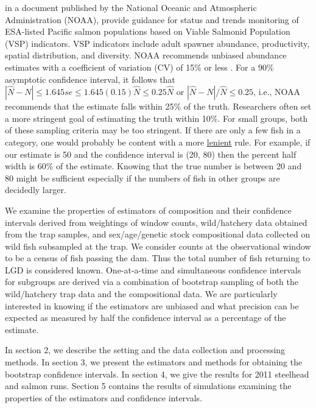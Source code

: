 \documentclass[12pt]{article}
\begin{document}
 in a document published by the National Oceanic and Atmospheric Administration (NOAA), provide guidance for status and trends monitoring of ESA-listed Pacific salmon populations based on Viable Salmonid Population (VSP) indicators. VSP indicators include adult spawner abundance, productivity, spatial distribution, and diversity. NOAA recommends unbiased abundance estimates with a coefficient of variation (CV) of 15\% or less \cite{Crawford2011}. For a 90\% asymptotic confidence interval, it follows that $ |\hat{N}-N|\le 1.645se\le 1.645(0.15)\hat{N}\le 0.25\hat{N}$ or $ |\hat{N}-N|/\hat{N}\le 0.25$, i.e., NOAA recommends that the estimate falls within 25\% of the truth. Researchers often set a more stringent goal of estimating the truth within 10\%.  For small groups, both of these sampling criteria may be too stringent.  If there are only a few fish in a category, one would probably be content with a more \underline{lenient} rule. For example, if our estimate is 50 and the confidence interval is (20, 80) then the percent half width is 60\% of the estimate. Knowing that the true number is between 20 and 80 might be sufficient especially if the numbers of fish in other groups are decidedly larger.

We examine the properties of estimators of composition and their confidence intervals derived from weightings of window counts, wild/hatchery data obtained from the trap samples, and sex/age/genetic stock compositional data collected on wild fish subsampled at the trap. We consider counts at the observational window to be a census of fish passing the dam. Thus the total number of fish returning to LGD is considered known.  One-at-a-time and simultaneous confidence intervals for subgroups are derived via a combination of bootstrap sampling of both the wild/hatchery trap data and the compositional data.  We are particularly interested in knowing if the estimators are unbiased and what precision can be expected as measured by half the confidence interval as a percentage of the estimate.

In section 2, we describe the setting and the data collection and processing methods. In section 3, we present the estimators and methods for obtaining the bootstrap confidence intervals. In section 4, we give the results for 2011 steelhead and salmon runs. Section 5 contains the results of simulations examining the properties of the estimators and confidence intervals.
\end{document}
